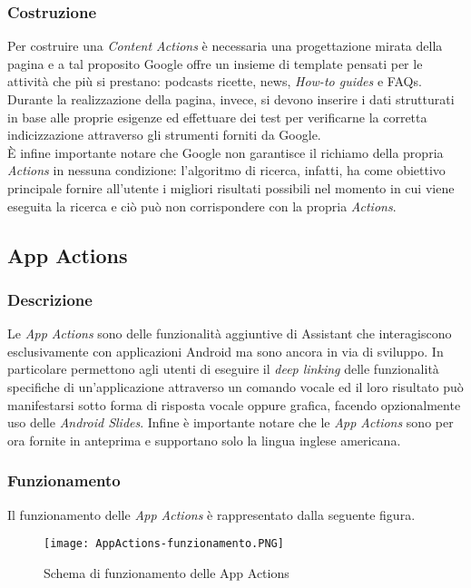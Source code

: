 		\subsubsection{Costruzione}
		Per costruire una \emph{Content Actions} è necessaria una progettazione mirata della pagina e a tal proposito Google offre un insieme di template pensati per le attività che più si prestano: podcasts ricette, news, \emph{How-to guides} e FAQs. \\
		Durante la realizzazione della pagina, invece, si devono inserire i dati strutturati in base alle proprie esigenze ed effettuare dei test per verificarne la corretta indicizzazione attraverso gli strumenti forniti da Google. \\
		È infine importante notare che Google non garantisce il richiamo della propria \emph{Actions} in nessuna condizione: l'algoritmo di ricerca, infatti, ha come obiettivo principale fornire all'utente i migliori risultati possibili nel momento in cui viene eseguita la ricerca e ciò può non corrispondere con la propria \emph{Actions}.
	\subsection{App Actions}
		\subsubsection{Descrizione}
		Le \emph{App Actions} sono delle funzionalità aggiuntive di Assistant che interagiscono esclusivamente con applicazioni Android ma sono ancora in via di sviluppo. In particolare permettono agli utenti di eseguire il \emph{deep linking} delle funzionalità specifiche di un'applicazione attraverso un comando vocale ed il loro risultato può manifestarsi sotto forma di risposta vocale oppure grafica, facendo opzionalmente uso delle \emph{Android Slides}.
		Infine è importante notare che le \emph{App Actions} sono per ora fornite in anteprima e supportano solo la lingua inglese americana.
		\subsubsection{Funzionamento}
		Il funzionamento delle \emph{App Actions} è rappresentato dalla seguente figura.
		
		\begin{figure}[htbp]
			\begin{center}
				\texttt{[image: AppActions-funzionamento.PNG]}
				\caption{Schema di funzionamento delle App Actions}
			\end{center}
		\end{figure}
		
